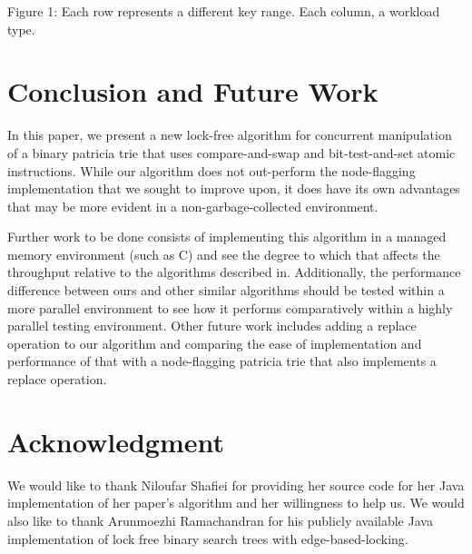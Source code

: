 \documentclass[conference]{IEEEtran}
\begin{document}
Figure 1: Each row represents a different key range. Each column, a workload type.
\clearpage


\section{Conclusion and Future Work}
In this paper, we present a new lock-free algorithm for concurrent manipulation of a binary patricia trie that uses compare-and-swap and bit-test-and-set atomic instructions. While our algorithm does not out-perform the node-flagging implementation that we sought to improve upon, it does have its own advantages that may be more evident in a non-garbage-collected environment.
\par
Further work to be done consists of implementing this algorithm in a managed memory environment (such as C) and see the degree to which that affects the throughput relative to the algorithms described in\cite{Shafiei2013}\cite{Natarajan2014}. Additionally, the performance difference between ours and other similar algorithms should be tested within a more parallel environment to see how it performs comparatively within a highly parallel testing environment. Other future work includes adding a replace operation to our algorithm and comparing the ease of implementation and performance of that with a node-flagging patricia trie that also implements a replace operation\cite{Shafiei2013}.


\section{Acknowledgment}
We would like to thank Niloufar Shafiei for providing her source code for her Java implementation of her paper's algorithm\cite{Shafiei2013} and her willingness to help us. We would also like to thank Arunmoezhi Ramachandran for his publicly available Java implementation of lock free binary search trees with edge-based-locking\cite{LFBST}.




\end{document}
